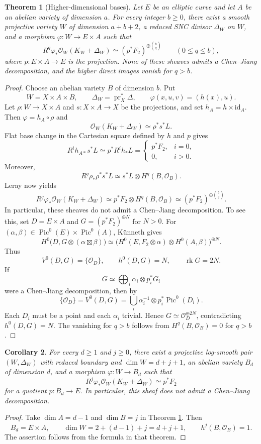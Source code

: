 \documentclass[11pt,letterpaper]{article}
\theoremstyle{paper}
\newtheorem{theorem}{Theorem}[section]
\newtheorem{corollary}[theorem]{Corollary}
\newcommand{\OO}{\mathcal O}
\DeclareMathOperator{\Pic}{Pic}
\DeclareMathOperator{\pr}{pr}
\DeclareMathOperator{\rk}{rk}
\begin{document}
\begin{theorem}[Higher-dimensional bases]\label{thm:base}
Let $E$ be an elliptic curve and let $A$ be an abelian variety of dimension $a$. For every integer $b\ge0$, there exist a smooth projective variety $W$ of dimension $a+b+2$, a reduced SNC divisor $\Delta_W$ on $W$, and a morphism $\varphi:W\to E\times A$ such that
\[
R^q\varphi_*\OO_W(K_W+\Delta_W)\simeq(p^*F_2)^{\oplus\binom bq}\qquad(0\le q\le b),
\]
where $p:E\times A\to E$ is the projection. None of these sheaves admits a Chen--Jiang decomposition, and the higher direct images vanish for $q>b$.
\end{theorem}
\begin{proof}
Choose an abelian variety $B$ of dimension $b$. Put
\[
W=X\times A\times B,\qquad\Delta_W=\pr_X^*\Delta,
\qquad\varphi(x,u,v)=(h(x),u).
\]
Let $\rho:W\to X\times A$ and $s:X\times A\to X$ be the projections, and set $h_A=h\times\mathrm{id}_A$. Then $\varphi=h_A\circ\rho$ and
\[
\OO_W(K_W+\Delta_W)\simeq\rho^*s^*L.
\]
Flat base change in the Cartesian square defined by $h$ and $p$ gives
\[
R^ih_{A*}s^*L\simeq p^*R^ih_*L=
\begin{cases}p^*F_2,&i=0,\\0,&i>0.\end{cases}
\]
Moreover,
\[
R^q\rho_*\rho^*s^*L\simeq s^*L\otimes H^q(B,\OO_B).
\]
Leray now yields
\[
R^q\varphi_*\OO_W(K_W+\Delta_W)
\simeq p^*F_2\otimes H^q(B,\OO_B)
\simeq(p^*F_2)^{\oplus\binom bq}.
\]
In particular, these sheaves do not admit a Chen--Jiang decomposition. To see this, set $D=E\times A$ and $G=(p^*F_2)^{\oplus N}$ for $N>0$. For $(\alpha,\beta)\in\Pic^0(E)\times\Pic^0(A)$, K\"unneth gives
\[
H^0\bigl(D,G\otimes(\alpha\boxtimes\beta)\bigr)
\simeq\bigl(H^0(E,F_2\otimes\alpha)\otimes H^0(A,\beta)\bigr)^{\oplus N}.
\]
Thus
\[
V^0(D,G)=\{\OO_D\},\qquad h^0(D,G)=N,\qquad\rk G=2N.
\]
If
\[
G\simeq\bigoplus_i\alpha_i\otimes p_i^*G_i
\]
were a Chen--Jiang decomposition, then by \cite[Lemma 3.3]{LPS}
\[
\{\OO_D\}=V^0(D,G)=\bigcup_i\alpha_i^{-1}\otimes p_i^*\Pic^0(D_i).
\]
Each $D_i$ must be a point and each $\alpha_i$ trivial. Hence $G\simeq\OO_D^{\oplus2N}$, contradicting $h^0(D,G)=N$. The vanishing for $q>b$ follows from $H^q(B,\OO_B)=0$ for $q>b$.
\end{proof}

\begin{corollary}\label{cor:all}
For every $d\ge1$ and $j\ge0$, there exist a projective log-smooth pair $(W,\Delta_W)$ with reduced boundary and $\dim W=d+j+1$, an abelian variety $B_d$ of dimension $d$, and a morphism $\varphi:W\to B_d$ such that
\[
R^j\varphi_*\OO_W(K_W+\Delta_W)\simeq p^*F_2
\]
for a quotient $p:B_d\to E$. In particular, this sheaf does not admit a Chen--Jiang decomposition.
\end{corollary}
\begin{proof}
Take $\dim A=d-1$ and $\dim B=j$ in Theorem \ref{thm:base}. Then
\[
B_d=E\times A,\qquad\dim W=2+(d-1)+j=d+j+1,\qquad h^j(B,\OO_B)=1.
\]
The assertion follows from the formula in that theorem.
\end{proof}
\end{document}
